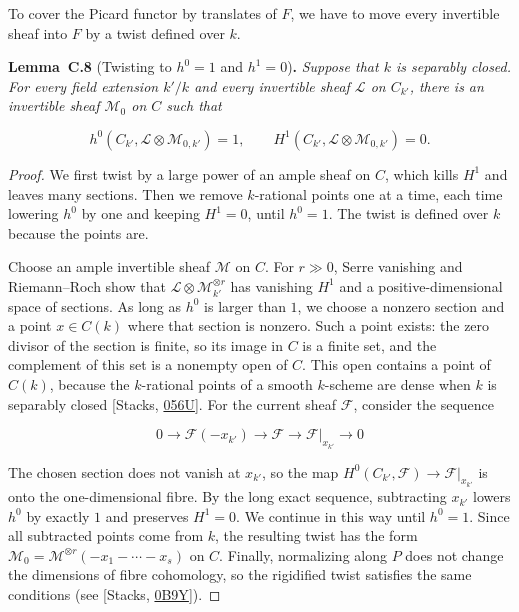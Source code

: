 \documentclass[11pt]{article}
\newenvironment{bpstatement}[2]{\par\addvspace{0.6\baselineskip}\noindent\textbf{#1}#2\textbf{.}\enspace\ignorespaces}
  {\par\addvspace{0.4\baselineskip}}
\newenvironment{bpstatementit}[2]{\begin{bpstatement}{#1}{#2}\itshape\ignorespaces}{\end{bpstatement}}
\begin{document}
\label{bp26}%
To cover the Picard functor by translates of \(F\), we have to move every invertible sheaf into \(F\) by a twist defined over \(k\).

\label{bp27}%
\begin{bpstatementit}{Lemma~C.8}{ (Twisting to $h^0=1$ and $h^1=0$)}
Suppose that \(k\) is separably closed. For every field extension \(k'/k\) and every invertible sheaf \(\mathcal L\) on \(C_{k'}\), there is an invertible sheaf \(\mathcal M_0\) on \(C\) such that

\[
h^0(C_{k'},\mathcal L\otimes\mathcal M_{0,k'})=1,
\qquad H^1(C_{k'},\mathcal L\otimes\mathcal M_{0,k'})=0.
\]
\end{bpstatementit}

\begin{proof}[{Proof}]\label{bp28}%
We first twist by a large power of an ample sheaf on \(C\), which kills \(H^1\) and leaves many sections. Then we remove \(k\)-rational points one at a time, each time lowering \(h^0\) by one and keeping \(H^1=0\), until \(h^0=1\). The twist is defined over \(k\) because the points are.

Choose an ample invertible sheaf \(\mathcal M\) on \(C\). For \(r\gg0\), Serre vanishing and Riemann–Roch show that \(\mathcal L\otimes\mathcal M_{k'}^{\otimes r}\) has vanishing \(H^1\) and a positive-dimensional space of sections. As long as \(h^0\) is larger than \(1\), we choose a nonzero section and a point \(x\in C(k)\) where that section is nonzero. Such a point exists: the zero divisor of the section is finite, so its image in \(C\) is a finite set, and the complement of this set is a nonempty open of \(C\). This open contains a point of \(C(k)\), because the \(k\)-rational points of a smooth \(k\)-scheme are dense when \(k\) is separably closed [Stacks, \href{https://stacks.math.columbia.edu/tag/056U}{056U}]. For the current sheaf \(\mathcal F\), consider the sequence

\[
0\longrightarrow\mathcal F(-x_{k'})
\longrightarrow\mathcal F
\longrightarrow\mathcal F|_{x_{k'}}\longrightarrow0
\]

The chosen section does not vanish at \(x_{k'}\), so the map \(H^0(C_{k'},\mathcal F)\to\mathcal F|_{x_{k'}}\) is onto the one-dimensional fibre. By the long exact sequence, subtracting \(x_{k'}\) lowers \(h^0\) by exactly \(1\) and preserves \(H^1=0\). We continue in this way until \(h^0=1\). Since all subtracted points come from \(k\), the resulting twist has the form \(\mathcal M_0=\mathcal M^{\otimes r}(-x_1-\cdots-x_s)\) on \(C\). Finally, normalizing along \(P\) does not change the dimensions of fibre cohomology, so the rigidified twist satisfies the same conditions (see [Stacks, \href{https://stacks.math.columbia.edu/tag/0B9Y}{0B9Y}]).
\end{proof}
\end{document}

